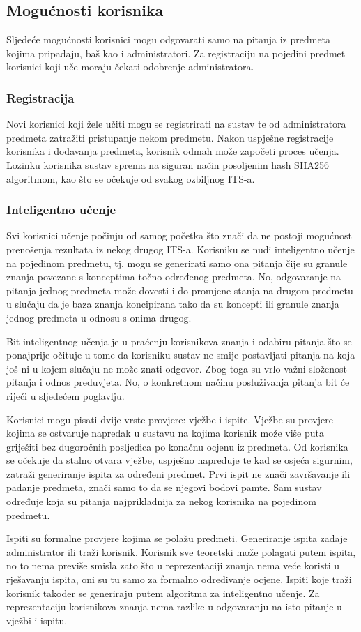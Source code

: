 \documentclass[times, utf8, zavrsni, numeric]{fer}
\begin{document}
\subsection{Mogućnosti korisnika}
Sljedeće mogućnosti korisnici mogu odgovarati samo na pitanja iz predmeta kojima pripadaju, baš kao i administratori. Za registraciju na pojedini predmet korisnici koji uče moraju čekati odobrenje administratora.

\subsubsection{Registracija}
Novi korisnici koji žele učiti mogu se registrirati na sustav te od administratora predmeta zatražiti pristupanje nekom predmetu. Nakon uspješne registracije korisnika i dodavanja predmeta, korisnik odmah može započeti proces učenja. Lozinku korisnika sustav sprema na siguran način posoljenim hash SHA256 algoritmom, kao što se očekuje od svakog ozbiljnog ITS-a.

\subsubsection{Inteligentno učenje}
Svi korisnici učenje počinju od samog početka što znači da ne postoji mogućnost prenošenja rezultata iz nekog drugog ITS-a. Korisniku se nudi inteligentno učenje na pojedinom predmetu, tj. mogu se generirati samo ona pitanja čije su granule znanja povezane s konceptima točno određenog predmeta. No, odgovaranje na pitanja jednog predmeta može dovesti i do promjene stanja na drugom predmetu u slučaju da je baza znanja koncipirana tako da su koncepti ili granule znanja jednog predmeta u odnosu s onima drugog.
\par
Bit inteligentnog učenja je u praćenju korisnikova znanja i odabiru pitanja što se ponajprije očituje u tome da korisniku sustav ne smije postavljati pitanja na koja još ni u kojem slučaju ne može  znati odgovor. Zbog toga su vrlo važni složenost pitanja i odnos preduvjeta. No, o konkretnom načinu posluživanja pitanja bit će riječi u sljedećem poglavlju.
\par
Korisnici mogu pisati dvije vrste provjere: vježbe i ispite. Vježbe su provjere kojima se ostvaruje napredak u sustavu na kojima korisnik može više puta griješiti bez dugoročnih posljedica po konačnu ocjenu iz predmeta. Od korisnika se očekuje da stalno otvara vježbe, uspješno napreduje te kad se osjeća sigurnim, zatraži generiranje ispita za određeni predmet. Prvi ispit ne znači završavanje ili padanje predmeta, znači samo to da se njegovi bodovi pamte. Sam sustav određuje koja su pitanja najprikladnija za nekog korisnika na pojedinom predmetu. 
\par
Ispiti su formalne provjere kojima se polažu predmeti. Generiranje ispita zadaje administrator ili traži korisnik. Korisnik sve teoretski može polagati putem ispita, no to nema previše smisla zato što u reprezentaciji znanja nema veće koristi u rješavanju ispita, oni su tu samo za formalno određivanje ocjene. Ispiti koje traži korisnik također se generiraju putem algoritma za inteligentno učenje. Za reprezentaciju korisnikova znanja nema razlike u odgovaranju na isto pitanje u vježbi i ispitu.
\end{document}
